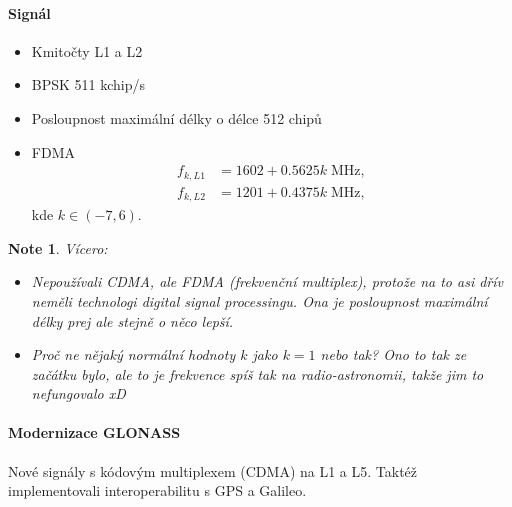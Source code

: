 \documentclass[11pt,a4paper]{article}
\theoremstyle{my-theorem}
\theoremstyle{non-theorem}
\newtheorem{note}[theorem]{Note}
\begin{document}
\paragraph*{Signál} 
\begin{itemize}
    \item Kmitočty L1 a L2
    \item BPSK 511 kchip/s
    \item Posloupnost maximální délky o délce 512 chipů
    \item FDMA
    \begin{align*}
        f_{k,L1} &= 1602 + 0.5625k \; \mathrm{MHz},
    \\
        f_{k,L2} &= 1201 + 0.4375k \; \mathrm{MHz},
    \end{align*}
    kde $k \in (-7, 6)$.
\end{itemize}
\begin{note} Vícero:
    \begin{itemize}
        \item Nepoužívali CDMA, ale FDMA (frekvenční multiplex), protože na to asi dřív neměli technologi digital signal processingu. Ona je posloupnost maximální délky prej ale stejně o něco lepší.
        \item Proč ne nějaký normální hodnoty $k$ jako $k = 1$ nebo tak? Ono to tak ze začátku bylo, ale to je frekvence spíš tak na radio-astronomii, takže jim to nefungovalo xD
    \end{itemize}
\end{note}

\paragraph*{Modernizace GLONASS} Nové signály s kódovým multiplexem (CDMA) na L1 a L5. Taktéž implementovali interoperabilitu s GPS a Galileo.
\end{document}
